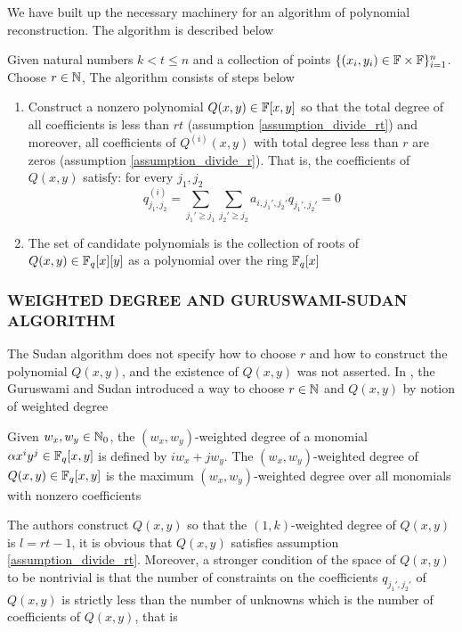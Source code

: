 \documentclass{article}
\begin{document}
We have built up the necessary machinery for an algorithm of polynomial reconstruction. The algorithm is described below

\begin{definition}
    Given natural numbers $k < t \leq n$ and a collection of points $\{(x_i, y_i) \in \mathbb{F} \times \mathbb{F}\}_{i=1}^n$. Choose $r \in \mathbb{N}$,
    The algorithm consists of steps below
    \begin{enumerate}
        \item Construct a nonzero polynomial $Q(x, y) \in \mathbb{F}[x, y]$ so that the total degree of all coefficients is less than $rt$ (assumption \ref{assumption_divide_rt}) and moreover, all coefficients of $Q^{(i)}(x, y)$ with total degree less than $r$ are zeros (assumption \ref{assumption_divide_r}). That is, the coefficients of $Q(x, y)$ satisfy: for every $j_1, j_2$
        $$
            q^{(i)}_{j_1, j_2} = \sum_{j_1' \geq j_1} \sum_{j_2' \geq j_2} a_{i, j_1', j_2'} q_{j_1', j_2'} = 0
        $$

        \item The set of candidate polynomials is the collection of roots of $Q(x, y) \in \mathbb{F}_q[x][y]$ as a polynomial over the ring $\mathbb{F}_q[x]$
    \end{enumerate}
\end{definition}

\subsubsection{WEIGHTED DEGREE AND GURUSWAMI-SUDAN ALGORITHM}

The Sudan algorithm does not specify how to choose $r$ and how to construct the polynomial $Q(x, y)$, and the existence of $Q(x, y)$ was not asserted. In \cite{743426}, the Guruswami and Sudan introduced a way to choose $r \in \mathbb{N}$ and $Q(x, y)$ by notion of weighted degree

\begin{definition}
    Given $w_x, w_y \in \mathbb{N}_0$, the $(w_x, w_y)$-weighted degree of a monomial $\alpha x^i y^j \in \mathbb{F}_q[x, y]$ is defined by $i w_x + j w_y$. The $(w_x, w_y)$-weighted degree of $Q(x, y) \in \mathbb{F}_q[x, y]$ is the maximum $(w_x, w_y)$-weighted degree over all monomials with nonzero coefficients
\end{definition}

The authors construct $Q(x, y)$ so that the $(1, k)$-weighted degree of $Q(x, y)$ is $l = rt - 1$, it is obvious that $Q(x, y)$ satisfies assumption \ref{assumption_divide_rt}. Moreover, a stronger condition of the space of $Q(x, y)$ to be nontrivial is that the number of constraints on the coefficients $q_{j_1', j_2'}$ of $Q(x, y)$ is strictly less than the number of unknowns which is the number of coefficients of $Q(x, y)$, that is
\end{document}
